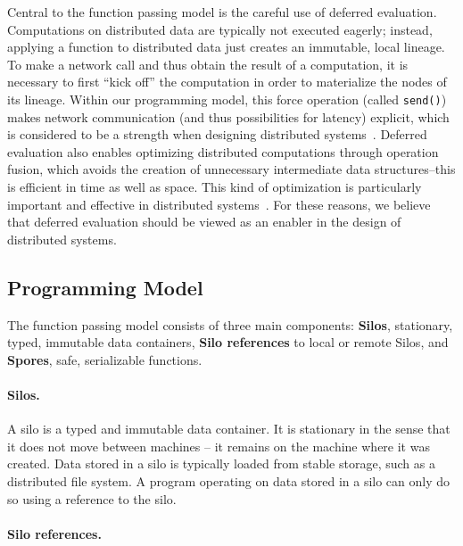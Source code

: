 \documentclass{jfp1}
\begin{document}
Central to the function passing model is the careful use of deferred evaluation.
Computations on distributed data are typically not executed eagerly; instead,
applying a function to distributed data just creates an immutable, local
lineage. To make a network call and thus obtain the result of a computation, it
is necessary to first ``kick off'' the computation in order to materialize the
nodes of its lineage. Within our programming model, this force operation (called
\verb|send()|) makes network communication (and thus possibilities for latency)
explicit, which is considered to be a strength when designing distributed
systems~\cite{ANoteDistComp}. Deferred evaluation also enables optimizing
distributed computations through operation fusion, which avoids the creation of
unnecessary intermediate data structures--this is efficient in time as well as
space. This kind of optimization is particularly important and effective in
distributed systems~\cite{FlumeJava}. For these reasons, we believe that
deferred evaluation should be viewed as an enabler in the design of distributed
systems.

\subsection{Programming Model}

The function passing model consists of three main components: \textbf{Silos},
stationary, typed, immutable data containers, \textbf{Silo references} to local
or remote Silos, and \textbf{Spores}, safe, serializable functions.

\paragraph{Silos.}

A silo is a typed and immutable data container. It is stationary in the sense
that it does not move between machines -- it remains on the machine where it was
created. Data stored in a silo is typically loaded from stable storage, such as
a distributed file system. A program operating on data stored in a silo can only
do so using a reference to the silo.

\paragraph{Silo references.}
\end{document}
